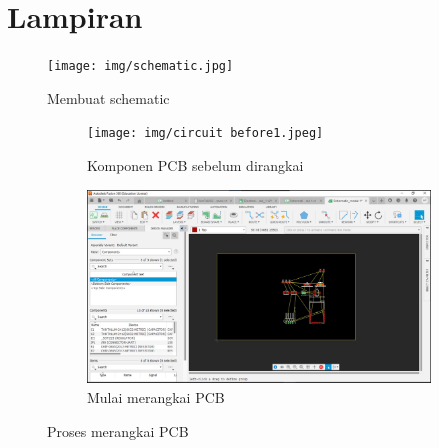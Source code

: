 \section*{Lampiran} %
\begin{figure}[H]
  \centering
  \texttt{[image: img/schematic.jpg]}
  \caption{Membuat schematic} 
  \label{fig:inirujukan}
\end{figure}
\vspace{0pt}
\begin{figure}[H]
  \centering
  \begin{subfigure}[b]{0.4\linewidth}
    \centering
    \texttt{[image: img/circuit before1.jpeg]}
    \caption{Komponen PCB sebelum dirangkai\label{fig:inisub1}}
  \end{subfigure}
  \hspace{1cm}
  \begin{subfigure}[b]{0.4\linewidth}
    \centering
    \includegraphics[width=\linewidth]{img/modul_1/circuit before.jpeg}
    \caption{Mulai merangkai PCB\label{fig:inisub2}}
  \end{subfigure}
  \caption{Proses merangkai PCB\label{fig:keduagambar}}
\end{figure}

